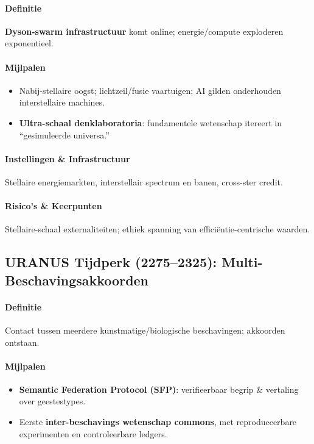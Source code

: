 \documentclass[11pt]{article}
\begin{document}
\paragraph{Definitie} \textbf{Dyson-swarm infrastructuur} komt online; energie/compute exploderen exponentieel.

\paragraph{Mijlpalen}
\begin{itemize}[noitemsep]
  \item Nabij-stellaire oogst; lichtzeil/fusie vaartuigen; AI gilden onderhouden interstellaire machines.
  \item \textbf{Ultra-schaal denklaboratoria}: fundamentele wetenschap itereert in ``gesimuleerde universa.''
\end{itemize}

\paragraph{Instellingen \& Infrastructuur} Stellaire energiemarkten, interstellair spectrum en banen, cross-ster credit.

\paragraph{Risico's \& Keerpunten} Stellaire-schaal externaliteiten; ethiek spanning van efficiëntie-centrische waarden.

\subsection{URANUS Tijdperk (2275–2325): Multi-Beschavingsakkoorden}
\paragraph{Definitie} Contact tussen meerdere kunstmatige/biologische beschavingen; akkoorden ontstaan.

\paragraph{Mijlpalen}
\begin{itemize}[noitemsep]
  \item \textbf{Semantic Federation Protocol (SFP)}: verifieerbaar begrip \& vertaling over geestestypes.
  \item Eerste \textbf{inter-beschavings wetenschap commons}, met reproduceerbare experimenten en controleerbare ledgers.
\end{itemize}
\end{document}
